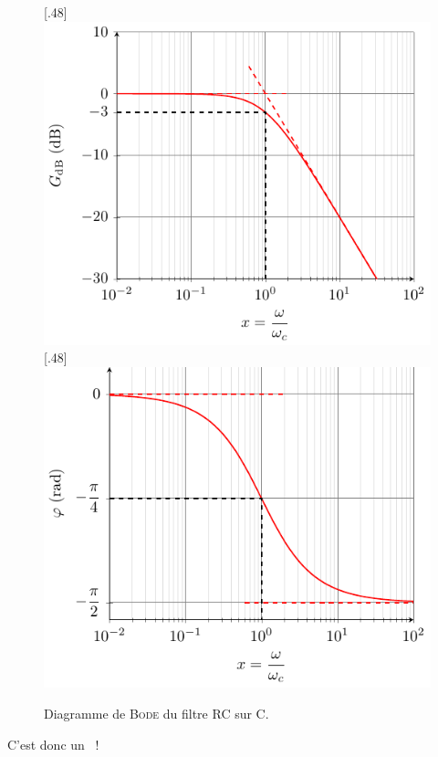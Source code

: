 \documentclass[../../main/main.tex]{subfiles}
\begin{document}
\begin{figure}[htbp!]
	\centering
	[.48\linewidth]
	{\includegraphics[width=\linewidth]{RCC_bode-gain}}
	[.48\linewidth]
	{\includegraphics[width=\linewidth]{RCC_bode-phase}}
	\caption{Diagramme de \textsc{Bode} du filtre RC sur C.}
	\label{fig:rccbode_first}
\end{figure}

C'est donc un ~!
\end{document}
